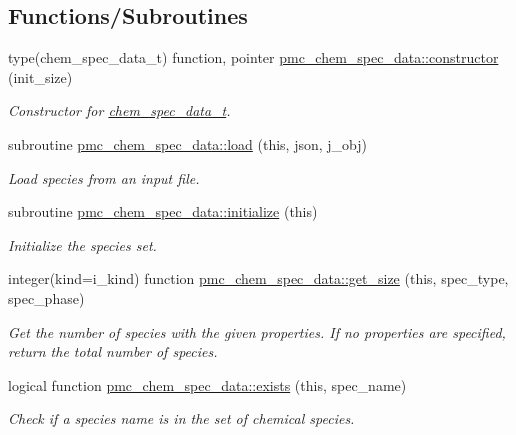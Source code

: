 \subsection*{Functions/\+Subroutines}
\begin{DoxyCompactItemize}
\item 
type(chem\+\_\+spec\+\_\+data\+\_\+t) function, pointer \mbox{\hyperlink{namespacepmc__chem__spec__data_a2f8149f3510f9754aa917e7bce1467cb}{pmc\+\_\+chem\+\_\+spec\+\_\+data\+::constructor}} (init\+\_\+size)
\begin{DoxyCompactList}\small\item\em Constructor for \mbox{\hyperlink{structpmc__chem__spec__data_1_1chem__spec__data__t}{chem\+\_\+spec\+\_\+data\+\_\+t}}. \end{DoxyCompactList}\item 
subroutine \mbox{\hyperlink{namespacepmc__chem__spec__data_a7115fe0b984c30ebb2dcc3ace92a7c7d}{pmc\+\_\+chem\+\_\+spec\+\_\+data\+::load}} (this, json, j\+\_\+obj)
\begin{DoxyCompactList}\small\item\em Load species from an input file. \end{DoxyCompactList}\item 
subroutine \mbox{\hyperlink{namespacepmc__chem__spec__data_acf9c162e6310c8b0dbf3ee1b47a80f85}{pmc\+\_\+chem\+\_\+spec\+\_\+data\+::initialize}} (this)
\begin{DoxyCompactList}\small\item\em Initialize the species set. \end{DoxyCompactList}\item 
integer(kind=i\+\_\+kind) function \mbox{\hyperlink{namespacepmc__chem__spec__data_a37e8dbcc45d70654ab71aea9980405fe}{pmc\+\_\+chem\+\_\+spec\+\_\+data\+::get\+\_\+size}} (this, spec\+\_\+type, spec\+\_\+phase)
\begin{DoxyCompactList}\small\item\em Get the number of species with the given properties. If no properties are specified, return the total number of species. \end{DoxyCompactList}\item 
logical function \mbox{\hyperlink{namespacepmc__chem__spec__data_a79f0ac8d379625ad9a96f52db1a972c4}{pmc\+\_\+chem\+\_\+spec\+\_\+data\+::exists}} (this, spec\+\_\+name)
\begin{DoxyCompactList}\small\item\em Check if a species name is in the set of chemical species. \end{DoxyCompactList}\item 

\end{DoxyCompactItemize}
